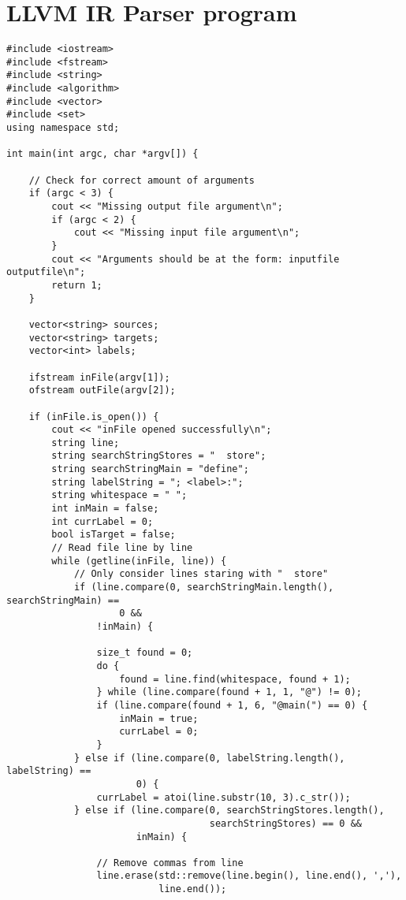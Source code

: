 \section{\label{lst:llvmirparserprogramcode}LLVM IR Parser program}
\lstset{language=C++,style=Cstyle}
\begin{lstlisting}
#include <iostream>
#include <fstream>
#include <string>
#include <algorithm>
#include <vector>
#include <set>
using namespace std;

int main(int argc, char *argv[]) {

    // Check for correct amount of arguments
    if (argc < 3) {
        cout << "Missing output file argument\n";
        if (argc < 2) {
            cout << "Missing input file argument\n";
        }
        cout << "Arguments should be at the form: inputfile outputfile\n";
        return 1;
    }

    vector<string> sources;
    vector<string> targets;
    vector<int> labels;

    ifstream inFile(argv[1]);
    ofstream outFile(argv[2]);

    if (inFile.is_open()) {
        cout << "inFile opened successfully\n";
        string line;
        string searchStringStores = "  store";
        string searchStringMain = "define";
        string labelString = "; <label>:";
        string whitespace = " ";
        int inMain = false;
        int currLabel = 0;
        bool isTarget = false;
        // Read file line by line
        while (getline(inFile, line)) {
            // Only consider lines staring with "  store"
            if (line.compare(0, searchStringMain.length(), searchStringMain) ==
                    0 &&
                !inMain) {

                size_t found = 0;
                do {
                    found = line.find(whitespace, found + 1);
                } while (line.compare(found + 1, 1, "@") != 0);
                if (line.compare(found + 1, 6, "@main(") == 0) {
                    inMain = true;
                    currLabel = 0;
                }
            } else if (line.compare(0, labelString.length(), labelString) ==
                       0) {
                currLabel = atoi(line.substr(10, 3).c_str());
            } else if (line.compare(0, searchStringStores.length(),
                                    searchStringStores) == 0 &&
                       inMain) {

                // Remove commas from line
                line.erase(std::remove(line.begin(), line.end(), ','),
                           line.end());


\end{lstlisting}
